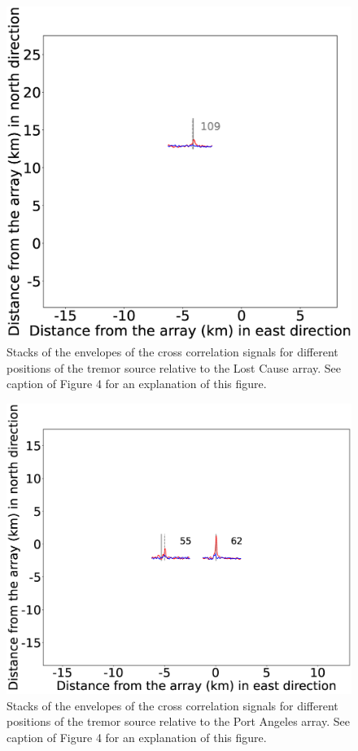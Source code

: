 \documentclass[draft]{agujournal2019}
\begin{document}
\begin{figure}
\noindent\includegraphics[width=\textwidth, trim={1cm 0.5cm 2.5cm 1.5cm},clip]{figures/LC_PWS_PWS_0.eps}
\caption{Stacks of the envelopes of the cross correlation signals for different positions of the tremor source relative to the Lost Cause array. See caption of Figure 4 for an explanation of this figure.}
\label{pngfiguresample}
\end{figure}

\begin{figure}
\noindent\includegraphics[width=\textwidth, trim={1.5cm 0.5cm 4.5cm 1.5cm},clip]{figures/PA_PWS_PWS_0.eps}
\caption{Stacks of the envelopes of the cross correlation signals for different positions of the tremor source relative to the Port Angeles array. See caption of Figure 4 for an explanation of this figure.}
\label{pngfiguresample}
\end{figure}
\end{document}
